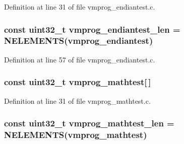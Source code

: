 \-Definition at line 31 of file vmprog\-\_\-endiantest.\-c.

\hypertarget{group___generic_i2_c_sensor_ga3158e6c7b2a8dff094103560829aba35}{
\subsubsection[{vmprog\-\_\-endiantest\-\_\-len}]{\setlength{\rightskip}{0pt plus 5cm}const uint32\-\_\-t {\bf vmprog\-\_\-endiantest\-\_\-len} = \-N\-E\-L\-E\-M\-E\-N\-T\-S({\bf vmprog\-\_\-endiantest})}}\label{group___generic_i2_c_sensor_ga3158e6c7b2a8dff094103560829aba35}


\-Definition at line 57 of file vmprog\-\_\-endiantest.\-c.

\hypertarget{group___generic_i2_c_sensor_ga4521deb4c490a6b3d44fc340ad4161cd}{
\subsubsection[{vmprog\-\_\-mathtest}]{\setlength{\rightskip}{0pt plus 5cm}const uint32\-\_\-t {\bf vmprog\-\_\-mathtest}\mbox{[}$\,$\mbox{]}}}\label{group___generic_i2_c_sensor_ga4521deb4c490a6b3d44fc340ad4161cd}


\-Definition at line 31 of file vmprog\-\_\-mathtest.\-c.

\hypertarget{group___generic_i2_c_sensor_gad7ec24bf861eca543cf96c11f9607fcc}{
\subsubsection[{vmprog\-\_\-mathtest\-\_\-len}]{\setlength{\rightskip}{0pt plus 5cm}const uint32\-\_\-t {\bf vmprog\-\_\-mathtest\-\_\-len} = \-N\-E\-L\-E\-M\-E\-N\-T\-S({\bf vmprog\-\_\-mathtest})}}\label{group___generic_i2_c_sensor_gad7ec24bf861eca543cf96c11f9607fcc}


